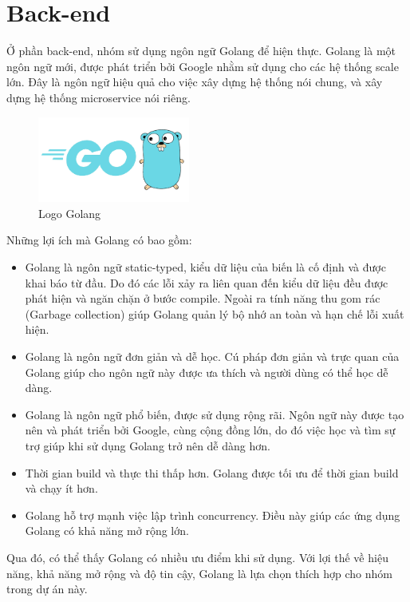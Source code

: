 \section{Back-end}
\hspace{0.5cm}Ở phần back-end, nhóm sử dụng ngôn ngữ Golang để hiện thực. Golang là một ngôn ngữ mới, được phát triển bởi Google nhằm sử dụng cho các hệ thống scale lớn. Đây là ngôn ngữ hiệu quả cho việc xây dựng hệ thống nói chung, và xây dựng hệ thống microservice nói riêng.

\begin{figure}[!htp]
    \begin{center}
        \includegraphics[width=5cm]{img/Technology/Golang.png}
    \end{center}
    \caption{Logo Golang \cite{technologyGolang}}
\end{figure}

Những lợi ích mà Golang có bao gồm\cite{technologyGolangReasons}:
\begin{itemize}
    \item Golang là ngôn ngữ static-typed, kiểu dữ liệu của biến là cố định và được khai báo từ đầu. Do đó các lỗi xảy ra liên quan đến kiểu dữ liệu đều được phát hiện và ngăn chặn ở bước compile. Ngoài ra tính năng thu gom rác (Garbage collection) giúp Golang quản lý bộ nhớ an toàn và hạn chế lỗi xuất hiện.
    \item Golang là ngôn ngữ đơn giản và dễ học. Cú pháp đơn giản và trực quan của Golang giúp cho ngôn ngữ này được ưa thích và người dùng có thể học dễ dàng.
    \item Golang là ngôn ngữ phổ biến, được sử dụng rộng rãi. Ngôn ngữ này được tạo nên và phát triển bởi Google, cùng cộng đồng lớn, do đó việc học và tìm sự trợ giúp khi sử dụng Golang trở nên dễ dàng hơn.
    \item Thời gian build và thực thi thấp hơn. Golang được tối ưu để thời gian build và chạy ít hơn.
    \item Golang hỗ trợ mạnh việc lập trình concurrency. Điều này giúp các ứng dụng Golang có khả năng mở rộng lớn.
\end{itemize}
\hspace{0.5cm}Qua đó, có thể thấy Golang có nhiều ưu điểm khi sử dụng. Với lợi thế về hiệu năng, khả năng mở rộng và độ tin cậy, Golang là lựa chọn thích hợp cho nhóm trong dự án này.